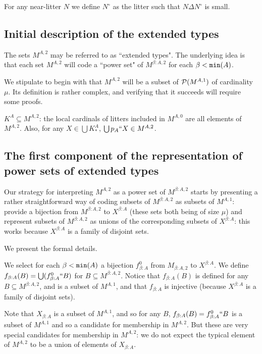 \documentclass[12pt]{article}
\begin{document}
For any near-litter $N$ we define $N^\circ$ as the litter such that $N \Delta N^\circ$ is small.

\subsection{Initial description of the extended types}

The sets $M^{A,2}$ may be referred to as ``extended types".  The underlying idea is that each set $M^{A,2}$ will code a ``power set" of $M^{\beta:A,2}$ for each
$\beta<{\tt min}(A)$.

We stipulate to begin with that $M^{A,2}$ will be a subset of ${\cal P}(M^{A,1})$ of cardinality $\mu$.  Its definition is rather complex, and verifying that it succeeds will require some proofs.

$K^A \subseteq M^{A,2}$:  the local cardinals of litters included in $M^{A,0}$ are all elements of $M^{A,2}$.  Also, for any $X \in \bigcup K^A_*$,  $\bigcup p_A``X \in M^{A,2}$.



\subsection{The first component of the representation of power sets of extended types}

Our strategy for interpreting $M^{A,2}$ as a power set of $M^{\beta:A,2}$ starts by presenting a rather straightforward way of coding subsets of $M^{\beta:A,2}$ as subsets of
$M^{A,1}$:  provide a bijection from $M^{\beta:A,2}$ to $X^{\beta:A}$ (these sets both being of size $\mu$) and represent subsets of $M^{\beta:A,2}$ as unions of the corresponding subsets of $X^{\beta:A}$:  this works because $X^{\beta:A}$ is a family of disjoint sets.

We present the formal details.

We select for each $\beta<{\tt min}(A)$ a bijection $f^0_{\beta:A}$ from $M_{\beta: A,2}$ to $X^{\beta:A}$.  We define $f_{\beta:A}(B) =\bigcup( f^0_{\beta:A}``B)$ for $B \subseteq M^{\beta: A,2}$.  Notice that $f_{\beta:A}(B)$ is defined for any $B \subseteq M^{\beta: A,2}$, and is a subset of $M^{A,1}$, and that  $f_{\beta:A}$ is injective (because $X^{\beta:A}$ is a family of disjoint sets).

Note that $X_{\beta:A}$ is a subset of $M^{A,1}$, and so for any $B$, $f_{\beta:A}(B) = f^0_{\beta:A}``B$ is a subset of $M^{A,1}$ and so a candidate
for membership in $M^{A,2}$.  But these are very special candidates for membership in $M^{A,2}$:  we do not expect the typical element of $M^{A,2}$ to be a union of elements of
$X_{\beta:A}$.
\end{document}
